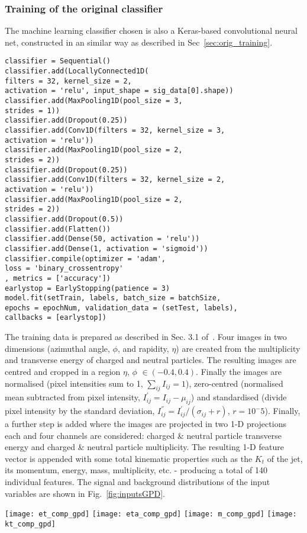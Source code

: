 \subsubsection{Training of the original classifier}

The machine learning classifier chosen is also a Keras-based convolutional neural net,
constructed in an similar way as described in Sec~\ref{sec:orig_training}.
\begin{lstlisting}
classifier = Sequential()
classifier.add(LocallyConnected1D(
filters = 32, kernel_size = 2,
activation = 'relu', input_shape = sig_data[0].shape))
classifier.add(MaxPooling1D(pool_size = 3,
strides = 1))
classifier.add(Dropout(0.25))
classifier.add(Conv1D(filters = 32, kernel_size = 3,
activation = 'relu'))
classifier.add(MaxPooling1D(pool_size = 2,
strides = 2))
classifier.add(Dropout(0.25))
classifier.add(Conv1D(filters = 32, kernel_size = 2,
activation = 'relu'))
classifier.add(MaxPooling1D(pool_size = 2,
strides = 2))
classifier.add(Dropout(0.5))
classifier.add(Flatten())
classifier.add(Dense(50, activation = 'relu'))
classifier.add(Dense(1, activation = 'sigmoid'))
classifier.compile(optimizer = 'adam',
loss = 'binary_crossentropy'
, metrics = ['accuracy'])
earlystop = EarlyStopping(patience = 3)
model.fit(setTrain, labels, batch_size = batchSize,
epochs = epochNum, validation_data = (setTest, labels),
callbacks = [earlystop])
\end{lstlisting}

The training data is prepared as described in Sec. 3.1 of~\cite{Komiske:2016rsd}. Four images
in two dimensions (azimuthal angle, $\phi$, and rapidity, $\eta$) are created from the multiplicity and
transverse energy of charged and neutral particles. The resulting images are centred and
cropped in a region $\eta$, $\phi$ $\in (-0.4, 0.4)$. Finally the images are normalised
(pixel intensities sum to 1, $\sum_{ij} I_{ij} = 1$), zero-centred (normalised mean subtracted
from pixel intensity, $I_{ij}^{'} = I_{ij} - \mu_{ij}$) and standardised (divide pixel intensity
by the standard deviation, $I^{''}_{ij} = I^{'}_{ij} / (\sigma_{ij} + r)$, $r = 10^-5$).
Finally, a further step is added where the images are projected in two 1-D projections each and
four channels are considered: charged \& neutral particle transverse energy and charged \& neutral
particle multiplicity. The resulting 1-D feature vector is appended with some
total kinematic properties such as the $K_t$ of the jet, its momentum, energy, mass,
multiplicity, etc. - producing a total of 140 individual features.
The signal and background distributions of the input variables
are shown in Fig.~\ref{fig:inputsGPD}.
%
\begin{figure*}[t]
\centering
\texttt{[image: et\_comp\_gpd]}
\texttt{[image: eta\_comp\_gpd]}
\texttt{[image: m\_comp\_gpd]}
\texttt{[image: kt\_comp\_gpd]}
\caption{\small Comparison of the signal and background distributions
used to train the Keras classifier .}
\label{fig:inputsGPD}
\end{figure*}

